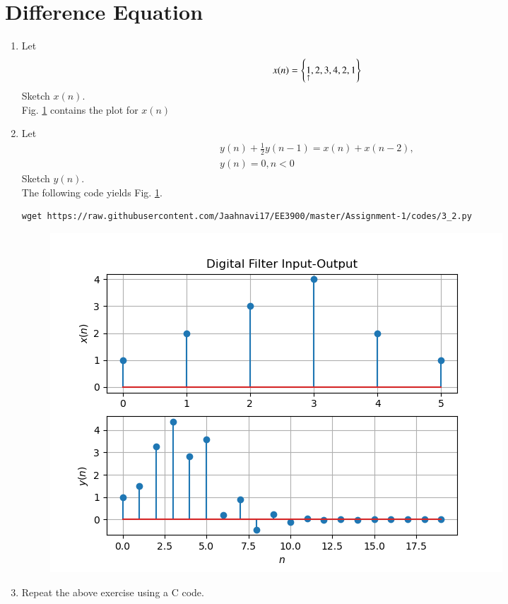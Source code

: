 \documentclass[journal,12pt,twocolumn]{IEEEtran}
\renewcommand\thesection{\arabic{section}}
\begin{document}
\section{Difference Equation}
\begin{enumerate}[label=\thesection.\arabic*,ref=\thesection.\theenumi]
\item Let \label{def:xn}
\begin{equation}
x(n) = \left\{\underset{\uparrow}{1},2,3,4,2,1\right\}\label{eq:xn}
\end{equation}
Sketch $x(n)$.\\
\solution Fig. \ref{fig:xnyn} contains the plot for $x(n)$
\item Let
\begin{multline}
\label{eq:iir_filter}
y(n) + \frac{1}{2}y(n-1) = x(n) + x(n-2), 
\\
 y(n) = 0, n < 0
\end{multline}
Sketch $y(n)$.
\\
\solution The following code yields Fig. \ref{fig:xnyn}.
\begin{lstlisting}
wget https://raw.githubusercontent.com/Jaahnavi17/EE3900/master/Assignment-1/codes/3_2.py
\end{lstlisting}
\begin{figure}[!ht]
\begin{center}
\includegraphics[width=\columnwidth]{figures/Figure_1.png}
\end{center}
\label{fig:xnyn}	
\end{figure}
\item Repeat the above exercise using a C code.\\
\solution


\end{enumerate}
\end{document}
